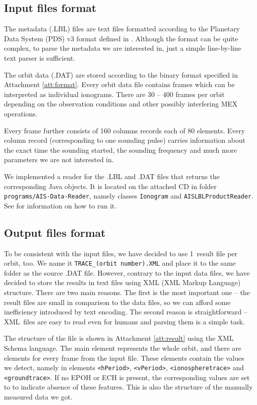 \subsection{Input files format}
The metadata (.LBL) files are text files formatted according to the Planetary Data System (PDS) v3 format defined in \citep{JPL2009}. Although the format can be quite complex, to parse the metadata we are interested in, just a simple line-by-line text parser is sufficient.

The orbit data (.DAT) are stored according to the binary format specified in Attachment \ref{att:format}. Every orbit data file contains frames which can be interpreted as individual ionograms. There are 30 -- 400 frames per orbit depending on the observation conditions and other possibly interfering MEX operations. 

Every frame further consists of 160 columns records each of 80 elements. Every column record (corresponding to one sounding pulse) carries information about the exact time the sounding started, the sounding frequency and much more parameters we are not interested in.

We implemented a reader for the .LBL and .DAT files that re\-turns the corresponding Java objects. It is located on the attached CD in folder \texttt{programs/AIS-Data-Reader}, namely classes \texttt{Ionogram} and \texttt{AISLBLProductReader}. See  for information on how to run it.

\subsection{Output files format}
To be consistent with the input files, we have decided to use 1~result file per orbit, too. We name it \texttt{TRACE\_(orbit number).XML} and place it to the same folder as the source .DAT file. However, contrary to the input data files, we have decided to store the results in text files using XML (XML Markup Language) structure. There are two main reasons. The first is the most important one -- the result files are small in comparison to the data files, so we can afford some inefficiency introduced by text encoding. The second reason is straightforward -- XML~files are easy to read even for humans and parsing them is a simple task.

The structure of the file is shown in Attachment \ref{att:result} using the XML Schema language. The main element represents the whole orbit, and there are elements for every frame from the input file. These elements contain the values we detect, namely in elements \texttt{<hPeriod>}, \texttt{<vPeriod>}, \texttt{<ionospheretrace>} and \texttt{<groundtrace>}. If no EPOH or ECH is present, the corresponding values are set to  to indicate absence of these features. This is also the structure of the manually measured data we got.

